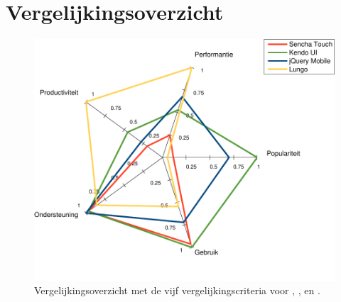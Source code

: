 \section{Vergelijkingsoverzicht}
\label{sec:evaluatie-spinnenweb}


\begin{figure}[H]
  \centering
  \includegraphics[width=\textwidth]{figuren/spidergraph.pdf}
  \caption{Vergelijkingsoverzicht met de vijf vergelijkingscriteria voor \st{},  \kendo{},  \jqm{} en \lungo{}.}
  \label{fig:spinnenweb}
\end{figure}




